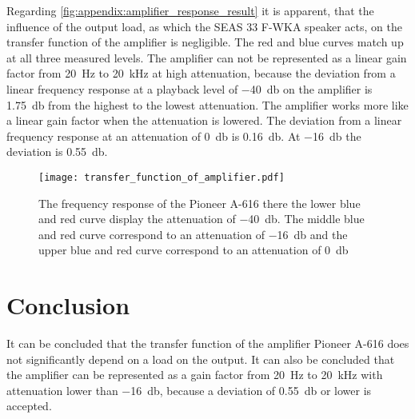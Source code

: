 Regarding \autoref{fig:appendix:amplifier_response_result} it is apparent, that the influence of the output load, as which the SEAS 33 F-WKA speaker acts, on the transfer function of the amplifier is negligible. The red and blue curves match up at all three measured levels. The amplifier can not be represented as a linear gain factor from \SI{20}{\hertz} to \SI{20}{\kilo\hertz} at high attenuation, because the deviation from a linear frequency response at a playback level of \SI{-40}{\decibel} on the amplifier is \SI{1.75}{\decibel} from the highest to the lowest attenuation. The amplifier works more like a linear gain factor when the attenuation is lowered. The deviation from a linear frequency response at an attenuation of \SI{0}{\decibel} is \SI{0.16}{\decibel}. At \SI{-16}{\decibel} the deviation is \SI{0.55}{\decibel}.



\begin{figure}[H]
	\centering
	\texttt{[image: transfer\_function\_of\_amplifier.pdf]}
	\caption{The frequency response of the Pioneer A-616 there the lower blue and red curve display the attenuation of \SI{-40}{\decibel}. The middle blue and red curve correspond to an attenuation of \SI{-16}{\decibel} and the upper blue and red curve correspond to an attenuation of  \SI{0}{\decibel}}
		\label{fig:appendix:amplifier_response_result}
\end{figure}

\section*{Conclusion}
It can be concluded that the transfer function of the amplifier Pioneer A-616 does not significantly depend on a load on the output. It can also be concluded that the amplifier can be represented as a gain factor from \SI{20}{\hertz} to \SI{20}{\kilo\hertz} with attenuation lower than \SI{-16}{\decibel}, because a deviation of \SI{0.55}{\decibel} or lower is accepted.

